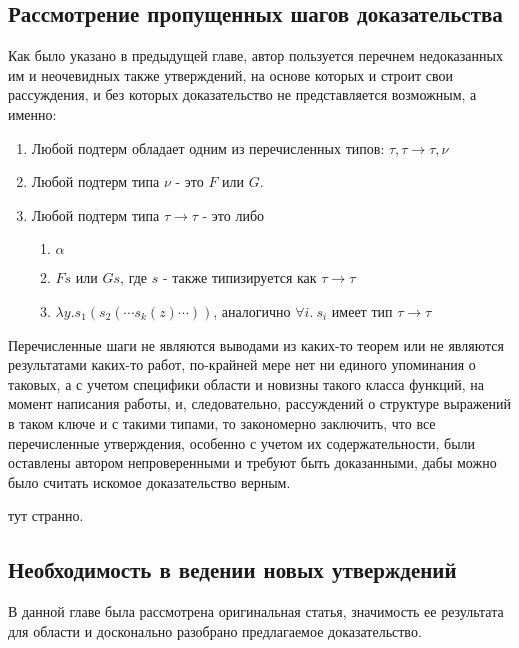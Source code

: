 \documentclass[times,specification,annotation]{itmo-student-thesis}
\begin{document}
\todo
\subsection{Рассмотрение пропущенных шагов доказательства}

Как было указано в предыдущей главе, автор пользуется перечнем недоказанных им и неочевидных также утверждений, на основе которых и строит свои рассуждения, и без которых доказательство не представляется возможным, а именно:

\begin{enumerate}
    \item Любой подтерм обладает одним из перечисленных типов: \(\tau, \tau \rightarrow \tau, \nu \)
    \item Любой подтерм типа \(\nu\) - это \(F\) или \(G\).
    \item Любой подтерм типа \(\tau \rightarrow \tau\) - это либо \begin{enumerate}
        \item \(\alpha\)
        \item \(F s\) или \(G s\), где \(s\) - также типизируется как \(\tau \rightarrow \tau\)
        \item \(\lambda y. s_1 (s_2 (\cdots s_k (z) \cdots))\), аналогично \(\forall i.\ s_i\) имеет тип \(\tau \rightarrow \tau\)
    \end{enumerate}
\end{enumerate}

Перечисленные шаги не являются выводами из каких-то теорем или не являются результатами каких-то работ, по-крайней мере нет ни единого упоминания о таковых, а с учетом специфики области и новизны такого класса функций, на момент написания работы, и, следовательно, рассуждений о структуре выражений в таком ключе и с такими типами, то закономерно заключить, что все перечисленные утверждения, особенно с учетом их содержательности, были оставлены автором непроверенными и требуют быть доказанными, дабы можно было считать искомое доказательство верным.


тут странно.
\todo
\subsection{Необходимость в ведении новых утверждений}
\todo

\chapterconclusion

В данной главе была рассмотрена оригинальная статья, значимость ее результата для области и досконально разобрано предлагаемое доказательство. 
\end{document}
